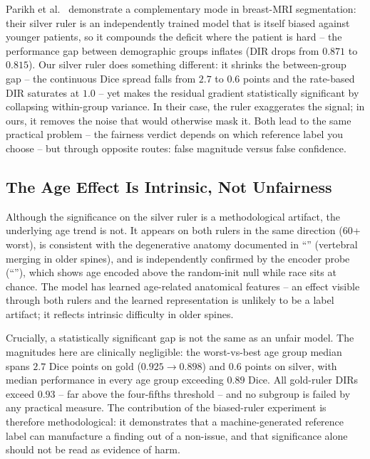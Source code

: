 Parikh et al.~\cite{parikh2025labelbias} demonstrate a complementary mode in
breast-MRI segmentation: their silver ruler is an independently trained model that
is itself biased against younger patients, so it compounds the deficit where the
patient is hard -- the performance gap between demographic groups inflates
(DIR drops from $0.871$ to $0.815$). Our silver ruler does something different: it
shrinks the between-group gap -- the continuous Dice spread falls from
$2.7$ to $0.6$ points and the rate-based DIR saturates at $1.0$ -- yet makes the
residual gradient statistically significant by collapsing within-group variance.
In their case, the ruler exaggerates the signal; in ours, it removes the noise
that would otherwise mask it. Both lead to the same practical problem -- the
fairness verdict depends on which reference label you choose -- but through
opposite routes: false magnitude versus false confidence.

\subsection{The Age Effect Is Intrinsic, Not Unfairness}
\label{sec:age_intrinsic}

Although the significance on the silver ruler is a methodological artifact, the
underlying age trend is not. It appears on both rulers in the same direction
(60+ worst), is consistent with the degenerative anatomy documented in
``'' (vertebral merging in older spines), and is
independently confirmed by the encoder probe
(``''), which shows age encoded above the
random-init null while race sits at chance. The model has learned age-related
anatomical features -- an effect visible through both rulers and the learned
representation is unlikely to be a label artifact; it reflects intrinsic
difficulty in older spines.

Crucially, a statistically significant gap is not the same as an unfair model.
The magnitudes here are clinically negligible: the worst-vs-best age group
median spans $2.7$ Dice points on gold ($0.925 \to 0.898$) and $0.6$ points on silver, with
median performance in every age group exceeding $0.89$ Dice. All gold-ruler DIRs
exceed $0.93$ -- far above the four-fifths threshold -- and no subgroup is failed
by any practical measure. The contribution of the biased-ruler experiment is
therefore methodological: it demonstrates that a machine-generated reference label
can manufacture a finding out of a non-issue, and that significance alone should
not be read as evidence of harm.

